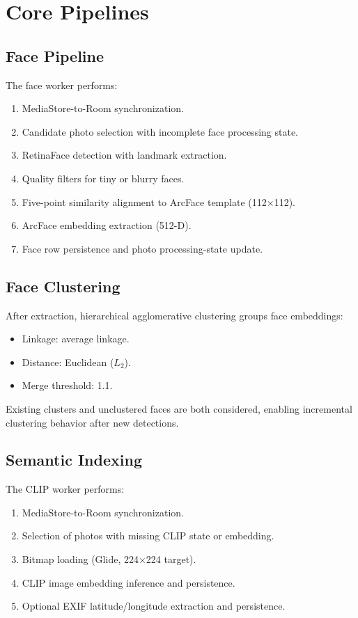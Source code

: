 \documentclass[conference]{IEEEtran}
\begin{document}
\section{Core Pipelines}
\subsection{Face Pipeline}
The face worker performs:
\begin{enumerate}
\item MediaStore-to-Room synchronization.
\item Candidate photo selection with incomplete face processing state.
\item RetinaFace detection with landmark extraction.
\item Quality filters for tiny or blurry faces.
\item Five-point similarity alignment to ArcFace template (112$\times$112).
\item ArcFace embedding extraction (512-D).
\item Face row persistence and photo processing-state update.
\end{enumerate}

\subsection{Face Clustering}
After extraction, hierarchical agglomerative clustering groups face embeddings:
\begin{itemize}
\item Linkage: average linkage.
\item Distance: Euclidean ($L_2$).
\item Merge threshold: 1.1.
\end{itemize}

Existing clusters and unclustered faces are both considered, enabling incremental clustering behavior after new detections.

\subsection{Semantic Indexing}
The CLIP worker performs:
\begin{enumerate}
\item MediaStore-to-Room synchronization.
\item Selection of photos with missing CLIP state or embedding.
\item Bitmap loading (Glide, 224$\times$224 target).
\item CLIP image embedding inference and persistence.
\item Optional EXIF latitude/longitude extraction and persistence.
\end{enumerate}
\end{document}
